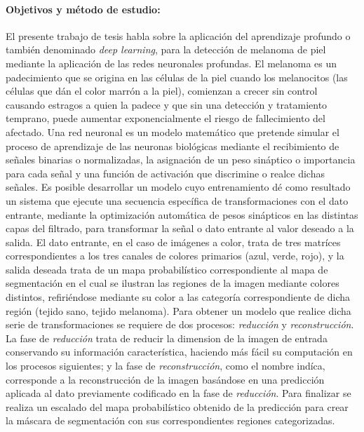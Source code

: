 {\paragraph{Objetivos y método de estudio:}
El presente trabajo de tesis habla sobre la aplicación del aprendizaje profundo o también denominado \emph{deep learning}, para la detección de melanoma de piel mediante la aplicación de las redes neuronales profundas.
El melanoma es un padecimiento que se origina en las células de la piel cuando los melanocitos (las células que dán el color marrón a la piel), comienzan a crecer sin control causando estragos a quien la padece y que sin una detección y tratamiento temprano, puede aumentar exponencialmente el riesgo de fallecimiento del afectado.
Una red neuronal es un modelo matemático que pretende simular el proceso de aprendizaje de las neuronas biológicas mediante el recibimiento de señales binarias o normalizadas, la asignación de un peso sináptico o importancia para cada señal y una función de activación que discrimine o realce dichas señales. Es posible desarrollar un modelo cuyo entrenamiento dé como resultado un sistema que ejecute una secuencia específica de transformaciones con el dato entrante, mediante la optimización automática de pesos sinápticos en las distintas capas del filtrado, para transformar la señal o dato entrante al valor deseado a la salida. El dato entrante, en el caso de imágenes a color, trata de tres matríces correspondientes a los tres canales de colores primarios (azul, verde, rojo), y la salida deseada trata de un mapa probabilístico correspondiente al mapa de segmentación en el cual se ilustran las regiones de la imagen mediante colores distintos, refiriéndose mediante su color a las categoría correspondiente de dicha región (tejido sano, tejido melanoma). Para obtener un modelo que realice dicha serie de transformaciones se requiere de dos procesos: \emph{reducción} y \emph{reconstrucción}. La fase de \emph{reducción} trata de reducir la dimension de la imagen de entrada conservando su información característica, haciendo más fácil su computación en los procesos siguientes; y la fase de \emph{reconstrucción}, como el nombre indíca, corresponde a la reconstrucción de la imagen basándose en una predicción aplicada al dato previamente codificado en la fase de \emph{reducción}. Para finalizar se realiza un escalado del mapa probabilístico obtenido de la predicción para crear la máscara de segmentación con sus correspondientes regiones categorizadas.

}
